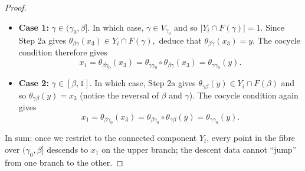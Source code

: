\documentclass[a4paper, 11pt,reqno]{amsart}
\begin{document}
\begin{proof}
{} %
	\begin{itemize}
		\item[] \textbf{Case 1:} $\gamma\in (\gamma_0,\beta]$. In which case, $\gamma\in V_{\gamma_0}$ and so $|Y_i\cap F(\gamma)|=1$. Since Step 2a gives $\theta_{\beta\gamma}(x_3)\in Y_i\cap F(\gamma),$ deduce that $\theta_{\beta\gamma}(x_3)=y$. The cocycle condition therefore gives 
		\[x_1=\theta_{\beta\gamma_0}(x_3)=\theta_{\gamma\gamma_0}\circ\theta_{\beta\gamma}(x_3)=\theta_{\gamma\gamma_0}(y).\]
	\item[] \textbf{Case 2:} $\gamma\in [\beta,1]$. In which case, Step 2a gives $\theta_{\gamma\beta}(y)\in Y_i\cap F(\beta)$ and so $\theta_{\gamma\beta}(y)=x_3$ (notice the reversal of $\beta$ and $\gamma$). The cocycle condition again gives
	$$x_1=\theta_{\beta\gamma_0}(x_3)=\theta_{\beta\gamma_0}\circ\theta_{\gamma\beta}(y)=\theta_{\gamma\gamma_0}(y). $$
	\end{itemize}
 In sum: once we restrict to the connected component $Y_i$, every point in the fibre over $(\gamma_0,\beta]$ descends to $x_1$ on the upper branch; the descent data cannot ``jump'' from one branch to the other.
 
	

\end{proof}
\end{document}
